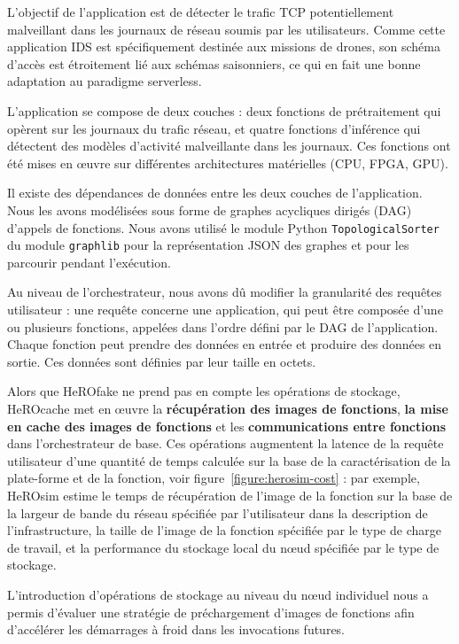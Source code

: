 L'objectif de l'application est de détecter le trafic TCP potentiellement malveillant dans les journaux de réseau soumis par les utilisateurs. Comme cette application IDS est spécifiquement destinée aux missions de drones, son schéma d'accès est étroitement lié aux schémas saisonniers, ce qui en fait une bonne adaptation au paradigme serverless.

L'application se compose de deux couches : deux fonctions de prétraitement qui opèrent sur les journaux du trafic réseau, et quatre fonctions d'inférence qui détectent des modèles d'activité malveillante dans les journaux. Ces fonctions ont été mises en œuvre sur différentes architectures matérielles (CPU, FPGA, GPU). 

Il existe des dépendances de données entre les deux couches de l'application. Nous les avons modélisées sous forme de graphes acycliques dirigés (DAG) d'appels de fonctions. Nous avons utilisé le module Python \texttt{TopologicalSorter} du module \texttt{graphlib} pour la représentation JSON des graphes et pour les parcourir pendant l'exécution.

Au niveau de l'orchestrateur, nous avons dû modifier la granularité des requêtes utilisateur : une requête concerne une application, qui peut être composée d'une ou plusieurs fonctions, appelées dans l'ordre défini par le DAG de l'application. Chaque fonction peut prendre des données en entrée et produire des données en sortie. Ces données sont définies par leur taille en octets.

Alors que HeROfake ne prend pas en compte les opérations de stockage, HeROcache met en œuvre la \textbf{récupération des images de fonctions}, \textbf{la mise en cache des images de fonctions} et les \textbf{communications entre fonctions} dans l'orchestrateur de base. Ces opérations augmentent la latence de la requête utilisateur d'une quantité de temps calculée sur la base de la caractérisation de la plate-forme et de la fonction, voir figure~\ref{figure:herosim-cost} : par exemple, HeROsim estime le temps de récupération de l'image de la fonction sur la base de la largeur de bande du réseau spécifiée par l'utilisateur dans la description de l'infrastructure, la taille de l'image de la fonction spécifiée par le type de charge de travail, et la performance du stockage local du nœud spécifiée par le type de stockage.

L'introduction d'opérations de stockage au niveau du nœud individuel nous a permis d'évaluer une stratégie de préchargement d'images de fonctions afin d'accélérer les démarrages à froid dans les invocations futures.

